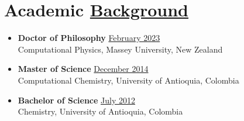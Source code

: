 \section{Academic \href{.}{Background}}

\begin{itemize}
    \itemsep-1mm
    \item {\bf Doctor of Philosophy}\hfill
          \href{.}{February 2023}\\
          Computational Physics, Massey University, New Zealand
    \item {\bf Master of Science}\hfill
          \href{.}{December 2014}\\
          Computational Chemistry, University of Antioquia, Colombia
    \item {\bf Bachelor of Science}\hfill
          \href{.}{July 2012}\\
          Chemistry, University of Antioquia, Colombia
\end{itemize}